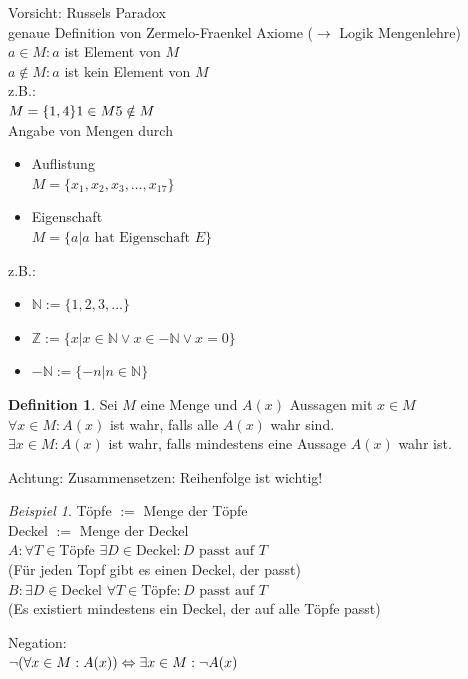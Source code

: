 \documentclass[12pt,a4paper,titlepage]{article} %
\theoremstyle{definition}
\newtheorem{defi}{Definition}[subsection]
\theoremstyle{remark}
\newtheorem*{bsp}{Beispiel}
\begin{document}
Vorsicht: Russels Paradox\\
genaue Definition von Zermelo-Fraenkel Axiome ($\rightarrow$ Logik Mengenlehre)\\
$a\in M: a$ ist Element von $M$\\
$a \notin M: a$ ist kein Element von $M$\\
z.B.:\\
$M = \{1, 4\}\\1\in M\\5 \notin M$\\
Angabe von Mengen durch 
\begin{itemize}
	\item Auflistung\\
	$M = \{x_1, x_2, x_3, \dots, x_{17} \}$
	\item Eigenschaft\\
	$M = \{a | a \text{ hat Eigenschaft } E\}$
\end{itemize}
z.B.:
\begin{itemize}
	\item $\mathbb{N} := \{1,2,3,\dots\}$
	\item $\mathbb{Z} := \{x | x \in \mathbb{N} \vee x \in -\mathbb{N} \vee x = 0 \}$
	\item $-\mathbb{N} := \{-n|n\in\mathbb{N}\}$
\end{itemize}
\begin{defi}
	Sei $M$ eine Menge und $A(x)$ Aussagen mit $x\in M$\\
	$\forall x \in M: A(x)$ ist wahr, falls alle $A(x)$ wahr sind.\\
	$\exists x\in M:A(x)$ ist wahr, falls mindestens eine Aussage $A(x)$ wahr ist.
\end{defi}
Achtung: Zusammensetzen: Reihenfolge ist wichtig!
\begin{bsp}
	Töpfe $:=$ Menge der Töpfe\\
	Deckel $:=$ Menge der Deckel\\
	$A: \forall T \in \text{Töpfe } \exists D\in \text{Deckel}: D \text{ passt auf } T$\\(Für jeden Topf gibt es einen Deckel, der passt)\\
	$B: \exists D \in \text{Deckel } \forall T \in \text{Töpfe}: D \text{ passt auf } T$\\(Es existiert mindestens ein Deckel, der auf alle Töpfe passt)
\end{bsp}
Negation:\\
$\neg (\forall x \in M : A(x)) \\ \Leftrightarrow \exists x \in M : \neg A(x)$\\
\end{document}
